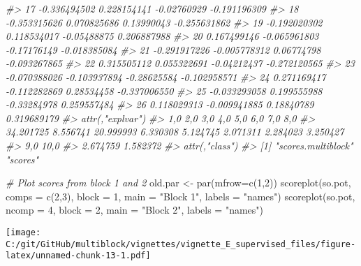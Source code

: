 \documentclass[
]{article}
\newenvironment{Shaded}{\begin{snugshade}}{\end{snugshade}}
\newcommand{\AttributeTok}[1]{\textcolor[rgb]{0.77,0.63,0.00}{#1}}
\newcommand{\CommentTok}[1]{\textcolor[rgb]{0.56,0.35,0.01}{\textit{#1}}}
\newcommand{\DecValTok}[1]{\textcolor[rgb]{0.00,0.00,0.81}{#1}}
\newcommand{\FunctionTok}[1]{\textcolor[rgb]{0.00,0.00,0.00}{#1}}
\newcommand{\NormalTok}[1]{#1}
\newcommand{\OtherTok}[1]{\textcolor[rgb]{0.56,0.35,0.01}{#1}}
\newcommand{\StringTok}[1]{\textcolor[rgb]{0.31,0.60,0.02}{#1}}
\begin{document}
\begin{Shaded}
\begin{Highlighting}[]
\CommentTok{\#\textgreater{} 17 {-}0.336494502  0.228154141 {-}0.02760929 {-}0.191196309}
\CommentTok{\#\textgreater{} 18 {-}0.353315626  0.070825686  0.13990043 {-}0.255631862}
\CommentTok{\#\textgreater{} 19 {-}0.192020302  0.118534017 {-}0.05488875  0.206887988}
\CommentTok{\#\textgreater{} 20  0.167499146 {-}0.065961803 {-}0.17176149 {-}0.018385084}
\CommentTok{\#\textgreater{} 21 {-}0.291917226 {-}0.005778312  0.06774798 {-}0.093267865}
\CommentTok{\#\textgreater{} 22  0.315505112  0.055322691 {-}0.04212437 {-}0.272120565}
\CommentTok{\#\textgreater{} 23 {-}0.070388026 {-}0.103937894 {-}0.28625584 {-}0.102958571}
\CommentTok{\#\textgreater{} 24  0.271169417 {-}0.112282869  0.28534458 {-}0.337006550}
\CommentTok{\#\textgreater{} 25 {-}0.033293058  0.199555988 {-}0.33284978  0.259557484}
\CommentTok{\#\textgreater{} 26  0.118029313 {-}0.009941885  0.18840789  0.319689179}
\CommentTok{\#\textgreater{} attr(,"explvar")}
\CommentTok{\#\textgreater{}       1,0       2,0       3,0       4,0       5,0       6,0       7,0       8,0 }
\CommentTok{\#\textgreater{} 34.201725  8.556741 20.999993  6.330308  5.124745  2.071311  2.284023  3.250427 }
\CommentTok{\#\textgreater{}       9,0      10,0 }
\CommentTok{\#\textgreater{}  2.674759  1.582372 }
\CommentTok{\#\textgreater{} attr(,"class")}
\CommentTok{\#\textgreater{} [1] "scores.multiblock" "scores"}
\end{Highlighting}
\end{Shaded}

\begin{Shaded}
\begin{Highlighting}[]
\CommentTok{\# Plot scores from block 1 and 2}
\NormalTok{old.par }\OtherTok{\textless{}{-}} \FunctionTok{par}\NormalTok{(}\AttributeTok{mfrow=}\FunctionTok{c}\NormalTok{(}\DecValTok{1}\NormalTok{,}\DecValTok{2}\NormalTok{))}
\FunctionTok{scoreplot}\NormalTok{(so.pot, }\AttributeTok{comps =} \FunctionTok{c}\NormalTok{(}\DecValTok{2}\NormalTok{,}\DecValTok{3}\NormalTok{), }\AttributeTok{block =} \DecValTok{1}\NormalTok{, }\AttributeTok{main =} \StringTok{"Block 1"}\NormalTok{, }\AttributeTok{labels =} \StringTok{"names"}\NormalTok{)}
\FunctionTok{scoreplot}\NormalTok{(so.pot, }\AttributeTok{ncomp =} \DecValTok{4}\NormalTok{, }\AttributeTok{block =} \DecValTok{2}\NormalTok{, }\AttributeTok{main =} \StringTok{"Block 2"}\NormalTok{, }\AttributeTok{labels =} \StringTok{"names"}\NormalTok{)}
\end{Highlighting}
\end{Shaded}

\texttt{[image: C:/git/GitHub/multiblock/vignettes/vignette\_E\_supervised\_files/figure-latex/unnamed-chunk-13-1.pdf]}
\end{document}
